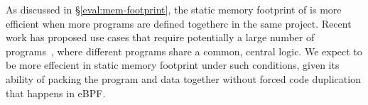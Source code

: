 
As discussed in \S\ref{eval:mem-footprint}, the static memory footprint of
    \projname{} is more efficient when more programs are defined togetherc in
    the same project.
Recent work has proposed use cases that require potentially a large number of
    programs~\cite{ebpf-kcfi}, where different programs share a common, central
    logic.
We expect \projname{} to be more effecient in static memory footprint under
    such conditions, given its ability of packing the program and data together
    without forced code duplication that happens in eBPF.

